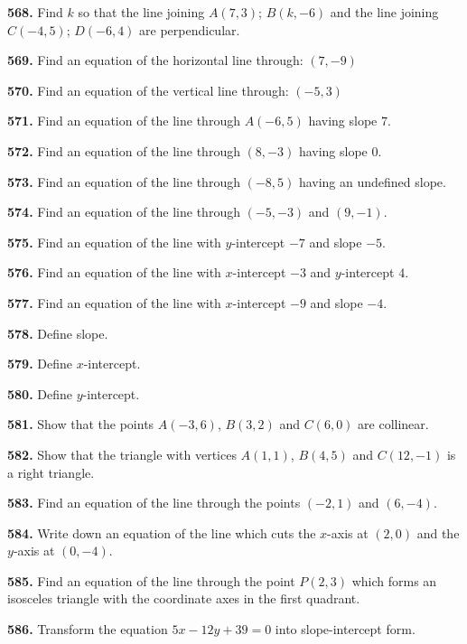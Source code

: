 \documentclass[11pt]{article}
\begin{document}
\bigskip
\noindent\textbf{568.} Find $k$ so that the line joining $A(7,3)$; $B(k,-6)$ and the line joining $C(-4,5)$; $D(-6,4)$ are perpendicular.

\bigskip
\noindent\textbf{569.} Find an equation of the horizontal line through: $(7,-9)$

\bigskip
\noindent\textbf{570.} Find an equation of the vertical line through: $(-5,3)$

\bigskip
\noindent\textbf{571.} Find an equation of the line through $A(-6,5)$ having slope $7$.

\bigskip
\noindent\textbf{572.} Find an equation of the line through $(8,-3)$ having slope $0$.

\bigskip
\noindent\textbf{573.} Find an equation of the line through $(-8,5)$ having an undefined slope.

\bigskip
\noindent\textbf{574.} Find an equation of the line through $(-5,-3)$ and $(9,-1)$.

\bigskip
\noindent\textbf{575.} Find an equation of the line with $y$-intercept $-7$ and slope $-5$.

\bigskip
\noindent\textbf{576.} Find an equation of the line with $x$-intercept $-3$ and $y$-intercept $4$.

\bigskip
\noindent\textbf{577.} Find an equation of the line with $x$-intercept $-9$ and slope $-4$.

\bigskip
\noindent\textbf{578.} Define slope.

\bigskip
\noindent\textbf{579.} Define $x$-intercept.

\bigskip
\noindent\textbf{580.} Define $y$-intercept.

\bigskip
\noindent\textbf{581.} Show that the points $A(-3,6)$, $B(3,2)$ and $C(6,0)$ are collinear.

\bigskip
\noindent\textbf{582.} Show that the triangle with vertices $A(1,1)$, $B(4,5)$ and $C(12,-1)$ is a right triangle.

\bigskip
\noindent\textbf{583.} Find an equation of the line through the points $(-2,1)$ and $(6,-4)$.

\bigskip
\noindent\textbf{584.} Write down an equation of the line which cuts the $x$-axis at $(2,0)$ and the $y$-axis at $(0,-4)$.

\bigskip
\noindent\textbf{585.} Find an equation of the line through the point $P(2,3)$ which forms an isosceles triangle with the coordinate axes in the first quadrant.

\bigskip
\noindent\textbf{586.} Transform the equation $5x-12y+39=0$ into slope-intercept form.
\end{document}
